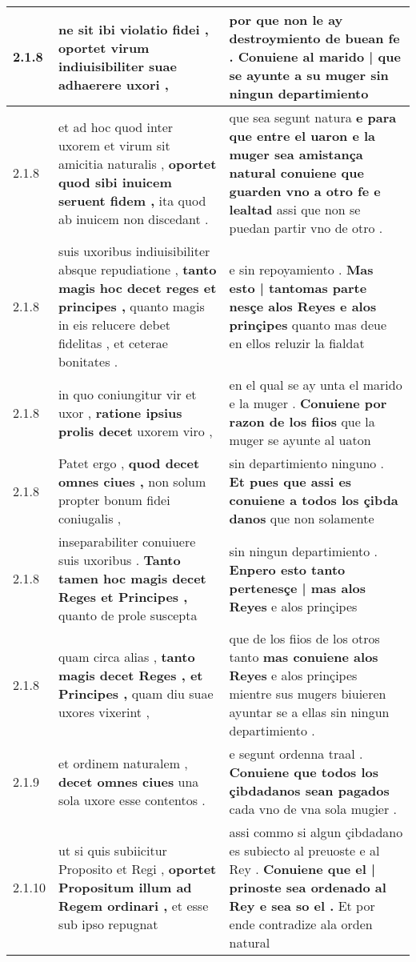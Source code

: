 \begin{tabular}{|p{1cm}|p{6.5cm}|p{6.5cm}|}
2.1.8 & ne sit ibi violatio fidei , \textbf{ oportet virum indiuisibiliter suae } adhaerere uxori , & por que non le ay destroymiento de buean fe . \textbf{ Conuiene al marido | que se ayunte a su muger } sin ningun departimiento \\\hline
2.1.8 & et ad hoc quod inter uxorem et virum sit amicitia naturalis , \textbf{ oportet quod sibi inuicem seruent fidem , } ita quod ab inuicem non discedant . & que sea segunt natura \textbf{ e para que entre el uaron e la muger sea amistança natural conuiene que guarden vno a otro fe e lealtad } assi que non se puedan partir vno de otro . \\\hline
2.1.8 & suis uxoribus indiuisibiliter absque repudiatione , \textbf{ tanto magis hoc decet reges et principes , } quanto magis in eis relucere debet fidelitas , et ceterae bonitates . & e sin repoyamiento . \textbf{ Mas esto | tantomas parte nesçe alos Reyes e alos prinçipes } quanto mas deue en ellos reluzir la fialdat \\\hline
2.1.8 & in quo coniungitur vir et uxor , \textbf{ ratione ipsius prolis decet } uxorem viro , & en el qual se ay unta el marido e la muger . \textbf{ Conuiene por razon de los fiios } que la muger se ayunte al uaton \\\hline
2.1.8 & Patet ergo , \textbf{ quod decet omnes ciues , } non solum propter bonum fidei coniugalis , & sin departimiento ninguno . \textbf{ Et pues que assi es conuiene a todos los çibda danos } que non solamente \\\hline
2.1.8 & inseparabiliter conuiuere suis uxoribus . \textbf{ Tanto tamen hoc magis decet Reges et Principes , } quanto de prole suscepta & sin ningun departimiento . \textbf{ Enpero esto tanto pertenesçe | mas alos Reyes } e alos prinçipes \\\hline
2.1.8 & quam circa alias , \textbf{ tanto magis decet Reges , et Principes , } quam diu suae uxores vixerint , & que de los fiios de los otros tanto \textbf{ mas conuiene alos Reyes } e alos prinçipes mientre sus mugers biuieren ayuntar se a ellas sin ningun departimiento . \\\hline
2.1.9 & et ordinem naturalem , \textbf{ decet omnes ciues } una sola uxore esse contentos . & e segunt ordenna traal . \textbf{ Conuiene que todos los çibdadanos sean pagados } cada vno de vna sola mugier . \\\hline
2.1.10 & ut si quis subiicitur Proposito et Regi , \textbf{ oportet Propositum illum ad Regem ordinari , } et esse sub ipso repugnat & assi commo si algun çibdadano es subiecto al preuoste e al Rey . \textbf{ Conuiene que el | prinoste sea ordenado al Rey e sea so el . } Et por ende contradize ala orden natural \\\hline

\end{tabular}

